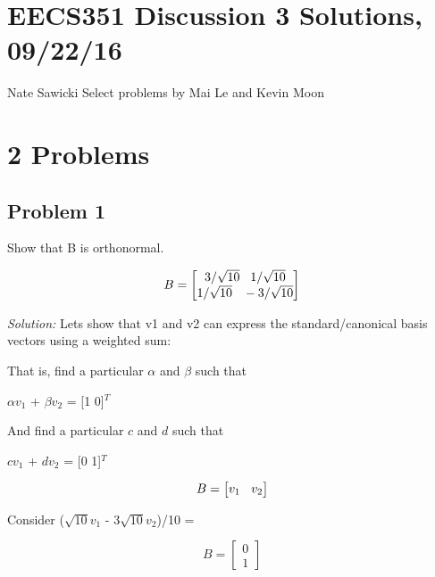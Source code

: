 \documentclass[11pt]{article}
\begin{document}
\section*{EECS351 Discussion 3 Solutions, 09/22/16}
Nate Sawicki \newline
Select problems by Mai Le and Kevin Moon

\section*{2 Problems}
\subsection*{Problem 1}
Show that B is orthonormal.

\begin{center}
\[
B = 
\begin{bmatrix}
   3/\sqrt{10} \hspace{3mm}   1/\sqrt{10} \\
   1/\sqrt{10} \hspace{3mm}   -3/\sqrt{10}           
\end{bmatrix}
\]
\end{center}

\vspace{4mm}
\emph{Solution:}
Lets show that v1 and v2 can express the standard/canonical basis vectors using a weighted sum:

\vspace{5mm}
That is, find a particular  $\alpha$ and $\beta$ such that
\begin{center}
 $\alpha$$v_1$ + $\beta$$v_2$ = [1 0]$^{T}$
\end{center}
And find a particular  $c$ and $d$ such that
\begin{center}
 $c$$v_1$ + $d$$v_2$ = [0 1]$^{T}$
\end{center}
\begin{center}
\[
B = 
\begin{bmatrix}
   v_1  \hspace{3mm}  v_2 
\end{bmatrix}
\]
\end{center}

\vspace{4mm}

Consider ($\sqrt{10}v_1$ - 3$\sqrt{10}v_2$)/10 =


\begin{center}
\[
B = 
\begin{bmatrix}
   0 \\
 1
\end{bmatrix}
\]
\end{center}
\end{document}
